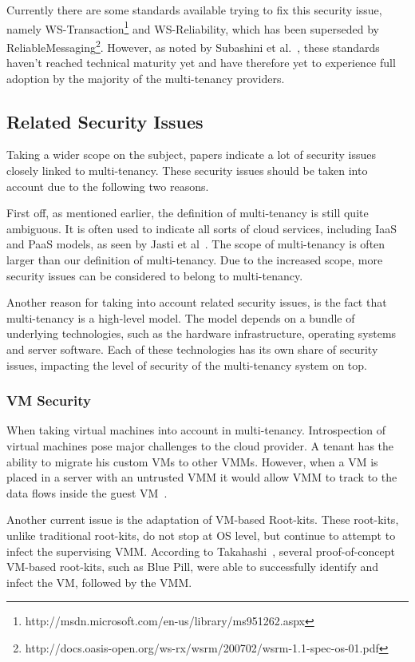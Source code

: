 Currently there are some standards available trying to fix this security issue, namely WS-Transaction\footnote{http://msdn.microsoft.com/en-us/library/ms951262.aspx} and WS-Reliability, which has been superseded by ReliableMessaging\footnote{http://docs.oasis-open.org/ws-rx/wsrm/200702/wsrm-1.1-spec-os-01.pdf}. 
However, as noted by Subashini et al.~\cite{Subashini2011Security}, these standards haven’t reached technical maturity yet and have therefore yet to experience full adoption by the majority of the multi-tenancy providers.

\subsection{Related Security Issues}
Taking a wider scope on the subject, papers indicate a lot of security issues closely linked to multi-tenancy. 
These security issues should be taken into account due to the following two reasons.

First off, as mentioned earlier, the definition of multi-tenancy is still quite ambiguous. 
It is often used to indicate all sorts of cloud services, including IaaS and PaaS models, as seen by Jasti et al~\cite{Jasti2010Security}. 
The scope of multi-tenancy is often larger than our definition of multi-tenancy. Due to the increased scope, more security issues can be considered to belong to multi-tenancy.

Another reason for taking into account related security issues, is the fact that multi-tenancy is a high-level model. 
The model depends on a bundle of underlying technologies, such as the hardware infrastructure, operating systems and server software. 
Each of these technologies has its own share of security issues, impacting the level of security of the multi-tenancy system on top. 

\subsubsection{\acf{VM} Security}
When taking virtual machines into account in multi-tenancy. 
Introspection of virtual machines pose major challenges to the cloud provider. 
A tenant has the ability to migrate his custom \acp{VM} to other \acp{VMM}. 
However, when a \ac{VM} is placed in a server with an untrusted \ac{VMM} it would allow \ac{VMM} to track to the data flows inside the guest VM~\cite{Takahashi2012Security}.

Another current issue is the adaptation of VM-based Root-kits. 
These root-kits, unlike traditional root-kits, do not stop at OS level, but continue to attempt to infect the supervising \ac{VMM}. 
According to Takahashi~\cite{Takahashi2012Security}, several proof-of-concept VM-based root-kits, such as Blue Pill, were able to successfully identify and infect the VM, followed by the \ac{VMM}.

